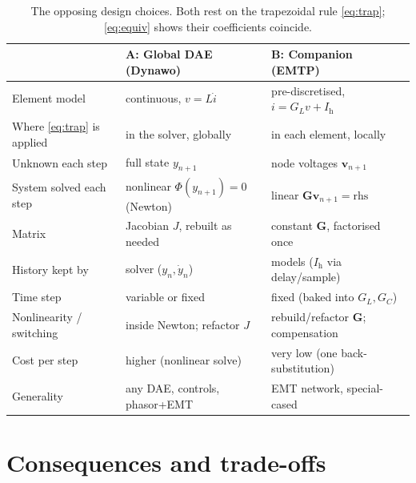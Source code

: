 \documentclass[11pt]{article}
\newcommand{\vv}{\mathbf{v}}
\begin{document}
\begin{table}[h]
\centering
\renewcommand{\arraystretch}{1.25}
\begin{tabular}{>{\raggedright\arraybackslash}p{} >{\raggedright\arraybackslash}p{} >{\raggedright\arraybackslash}p{}}
\toprule
 & \textbf{A: Global DAE (Dynawo)} & \textbf{B: Companion (EMTP)} \\
\midrule
Element model & continuous, $v=L\dot i$ & pre-discretised, $i=G_L v+I_{\mathrm{h}}$ \\
Where \eqref{eq:trap} is applied & in the solver, globally & in each element, locally \\
Unknown each step & full state $y_{n+1}$ & node voltages $\vv_{n+1}$ \\
System solved each step & nonlinear $\Phi(y_{n+1})=0$ (Newton) & linear $\mathbf{G}\vv_{n+1}=\text{rhs}$ \\
Matrix & Jacobian $J$, rebuilt as needed & constant $\mathbf{G}$, factorised once \\
History kept by & solver ($y_n,\dot y_n$) & models ($I_{\mathrm{h}}$ via delay/sample) \\
Time step & variable or fixed & fixed (baked into $G_L,G_C$) \\
Nonlinearity / switching & inside Newton; refactor $J$ & rebuild/refactor $\mathbf{G}$; compensation \\
Cost per step & higher (nonlinear solve) & very low (one back-substitution) \\
Generality & any DAE, controls, phasor+EMT & EMT network, special-cased \\
\bottomrule
\end{tabular}
\caption{The opposing design choices. Both rest on the trapezoidal rule
\eqref{eq:trap}; \eqref{eq:equiv} shows their coefficients coincide.}
\end{table}

\section{Consequences and trade-offs}
\end{document}
